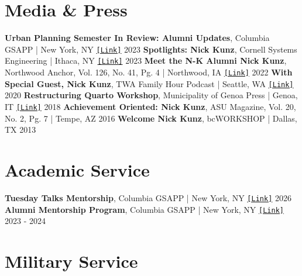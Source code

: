 \documentclass{article}
\begin{document}
    \section*{Media \& Press}
        \textbf{Urban Planning Semester In Review: Alumni Updates}, Columbia GSAPP | New York, NY \href{https://www.arch.columbia.edu/books/reader/1038-spring-2023-urban-planning-semester-in-review}{\texttt{[Link]}} \hfill{2023}\newline
        \textbf{Spotlights: Nick Kunz}, Cornell Systems Engineering | Ithaca, NY \href{https://www.systemseng.cornell.edu/spotlights/nick-kunz-dont-be-afraid-ask-questions}{\texttt{[Link]}} \hfill{2023}\newline
        \textbf{Meet the N-K Alumni Nick Kunz}, Northwood Anchor, Vol. 126, No. 41, Pg. 4 | Northwood, IA \href{http://nwdanchor.com/sites/default/files/2022anchor41.pdf}{\texttt{[Link]}} \hfill{2022}\newline
        \textbf{With Special Guest, Nick Kunz}, TWA Family Hour Podcast | Seattle, WA \href{https://open.spotify.com/episode/0l8c8KgPqvf0BZSTIMbufI?si=a6d964dfb0b7439b}{\texttt{[Link]}} \hfill{2020}\newline
        \textbf{Restructuring Quarto Workshop}, Municipality of Genoa Press | Genoa, IT\space 
        \href{https://www2.comune.genova.it//content/restructuring-quarto-workshop-le-idee-degli-studenti-della-columbia-university-l39ex-op}{\texttt{[Link]}} \hfill{2018}\newline
        \textbf{Achievement Oriented: Nick Kunz}, ASU Magazine, Vol. 20, No. 2, Pg. 7 | Tempe, AZ\space 
        \hfill{2016}\newline
        \textbf{Welcome Nick Kunz}, bcWORKSHOP | Dallas, TX\space 
        \hfill{2013}
    \section*{Academic Service}
    \textbf{Tuesday Talks Mentorship}, Columbia GSAPP | New York, NY \href{https://www.arch.columbia.edu/events/4275-tuesday-talks}{\texttt{[Link]}} \hfill{2026}\newline
    \textbf{Alumni Mentorship Program}, Columbia GSAPP | New York, NY \href{https://www.arch.columbia.edu/books/reader/1226-fall-2024-urban-planning-semester-in-review}{\texttt{[Link]}} \hfill{2023 - 2024} 
    \section*{Military Service}
\end{document}
